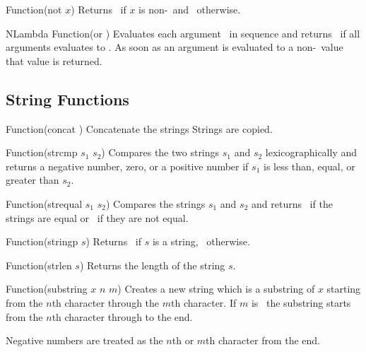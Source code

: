 \begin{defun}{Function}{(not $x$)}
  Returns \NIL\ if $x$ is non-\NIL\ and \T\ otherwise.
\end{defun}


\begin{defun}{NLambda Function}{(or \xargs)}
  Evaluates each argument \largs\ in sequence and returns \NIL\ if all
  arguments evaluates to \NIL. As soon as an argument is evaluated to
  a non-\NIL\ value that value is returned.
\end{defun}

\subsection{String Functions}

\begin{defun}{Function}{(concat \xargs)}
  Concatenate the strings \largs Strings are copied.
\end{defun}

\begin{defun}{Function}{(strcmp $s_{1}$ $s_{2}$)}
  Compares the two strings $s_{1}$ and $s_{2}$ lexicographically and
  returns a negative number, zero, or a positive number if $s_{1}$ is
  less than, equal, or greater than $s_{2}$.
\end{defun}

\begin{defun}{Function}{(strequal $s_{1}$ $s_{2}$)}
  Compares the strings $s_{1}$ and $s_{2}$ and returns \T\ if the
  strings are equal or \NIL\ if they are not equal.
\end{defun}

\begin{defun}{Function}{(stringp $s$)}
  Returns \T\ if $s$ is a string, \NIL\ otherwise.
\end{defun}

\begin{defun}{Function}{(strlen $s$)}
  Returns the length of the string $s$.
\end{defun}

\begin{defun}{Function}{(substring $x$ $n$ $m$)}
  Creates a new string which is a substring of $x$ starting from the
  $n$th character through the $m$th character. If $m$ is \NIL\ the
  substring starts from the $n$th character through to the end.

  Negative numbers are treated as the $n$th or $m$th character from
  the end.

  \begin{examples}
  \end{examples}

\end{defun}


